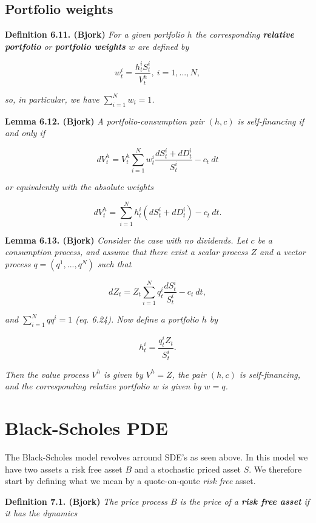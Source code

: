 \documentclass[a4paper,12pt,openany]{book}
\begin{document}
\hypertarget{portfolio-weights}{%
\subsection{Portfolio weights}\label{portfolio-weights}}

\textbf{Definition 6.11. (Bjork)} \emph{For a given portfolio \(h\) the corresponding \textbf{relative portfolio} or \textbf{portfolio weights} \(w\) are defined by}

\[
w_t^i=\frac{h_t^iS_t^i}{V_t^h},\ i=1,...,N,\tag{6.21}
\]

\emph{so, in particular, we have \(\sum_{i=1}^N w_i=1\).}

\textbf{Lemma 6.12. (Bjork)} \emph{A portfolio-consumption pair \((h,c)\) is self-financing if and only if}

\[
dV_t^h=V_t^h\sum_{i=1}^N w_t^i\frac{dS_t^i+dD_t^i}{S_t^i}-c_t\ dt\tag{6.22}
\]

\emph{or equivalently with the absolute weights}

\[
dV_t^h=\sum_{i=1}^N h_t^i(dS_t^i+dD_t^i)-c_t\ dt.
\]

\textbf{Lemma 6.13. (Bjork)} \emph{Consider the case with no dividends. Let \(c\) be a consumption process, and assume that there exist a scalar process \(Z\) and a vector process \(q=(q^1,...,q^N)\) such that}

\[
dZ_t=Z_t\sum_{i=1}^N q_t^i\frac{dS_t^i}{S_t^i}-c_t\ dt,\tag{6.23}
\]

\emph{and \(\sum_{i=1}^Nqq^i=1\) (eq. 6.24). Now define a portfolio \(h\) by}

\[
h_t^i=\frac{q_t^iZ_t}{S_t^i}.\tag{6.25}
\]

\emph{Then the value process \(V^h\) is given by \(V^h=Z\), the pair \((h,c)\) is self-financing, and the corresponding relative portfolio \(w\) is given by \(w=q\).}

\hypertarget{black-scholes-pde}{%
\section{Black-Scholes PDE}\label{black-scholes-pde}}

The Black-Scholes model revolves arround SDE's as seen above. In this model we have two assets a risk free asset \(B\) and a stochastic priced asset \(S\). We therefore start by defining what we mean by a quote-on-qoute \emph{risk free} asset.

\textbf{Definition 7.1. (Bjork)} \emph{The price process \(B\) is the price of a \textbf{risk free asset} if it has the dynamics}
\end{document}
